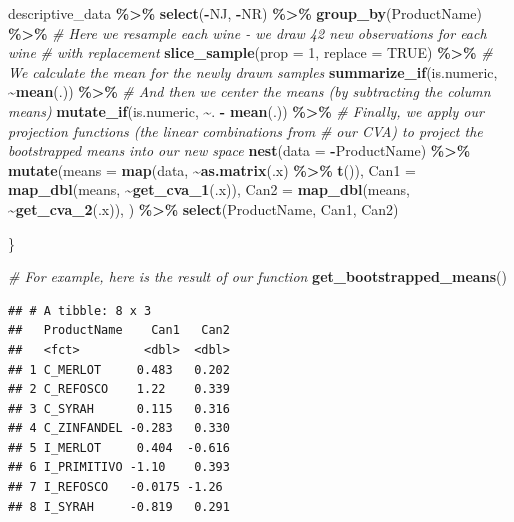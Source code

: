 \documentclass[
]{book}
\newenvironment{Shaded}{\begin{snugshade}}{\end{snugshade}}
\newcommand{\AttributeTok}[1]{\textcolor[rgb]{0.13,0.29,0.53}{#1}}
\newcommand{\CommentTok}[1]{\textcolor[rgb]{0.56,0.35,0.01}{\textit{#1}}}
\newcommand{\ConstantTok}[1]{\textcolor[rgb]{0.56,0.35,0.01}{#1}}
\newcommand{\DecValTok}[1]{\textcolor[rgb]{0.00,0.00,0.81}{#1}}
\newcommand{\FunctionTok}[1]{\textcolor[rgb]{0.13,0.29,0.53}{\textbf{#1}}}
\newcommand{\NormalTok}[1]{#1}
\newcommand{\SpecialCharTok}[1]{\textcolor[rgb]{0.81,0.36,0.00}{\textbf{#1}}}
\begin{document}
\begin{Shaded}
\begin{Highlighting}[]
\NormalTok{  descriptive\_data }\SpecialCharTok{\%\textgreater{}\%}
  \FunctionTok{select}\NormalTok{(}\SpecialCharTok{{-}}\NormalTok{NJ, }\SpecialCharTok{{-}}\NormalTok{NR) }\SpecialCharTok{\%\textgreater{}\%}
  \FunctionTok{group\_by}\NormalTok{(ProductName) }\SpecialCharTok{\%\textgreater{}\%}
    \CommentTok{\# Here we resample each wine {-} we draw 42 new observations for each wine}
    \CommentTok{\# with replacement}
  \FunctionTok{slice\_sample}\NormalTok{(}\AttributeTok{prop =} \DecValTok{1}\NormalTok{, }\AttributeTok{replace =} \ConstantTok{TRUE}\NormalTok{) }\SpecialCharTok{\%\textgreater{}\%}
    \CommentTok{\# We calculate the mean for the newly drawn samples}
  \FunctionTok{summarize\_if}\NormalTok{(is.numeric, }\SpecialCharTok{\textasciitilde{}}\FunctionTok{mean}\NormalTok{(.)) }\SpecialCharTok{\%\textgreater{}\%} 
    \CommentTok{\# And then we center the means (by subtracting the column means)}
  \FunctionTok{mutate\_if}\NormalTok{(is.numeric, }\SpecialCharTok{\textasciitilde{}}\NormalTok{. }\SpecialCharTok{{-}} \FunctionTok{mean}\NormalTok{(.)) }\SpecialCharTok{\%\textgreater{}\%}
    \CommentTok{\# Finally, we apply our projection functions (the linear combinations from}
    \CommentTok{\# our CVA) to project the bootstrapped means into our new space}
  \FunctionTok{nest}\NormalTok{(}\AttributeTok{data =} \SpecialCharTok{{-}}\NormalTok{ProductName) }\SpecialCharTok{\%\textgreater{}\%}
  \FunctionTok{mutate}\NormalTok{(}\AttributeTok{means =} \FunctionTok{map}\NormalTok{(data, }\SpecialCharTok{\textasciitilde{}}\FunctionTok{as.matrix}\NormalTok{(.x) }\SpecialCharTok{\%\textgreater{}\%} \FunctionTok{t}\NormalTok{()),}
         \AttributeTok{Can1 =} \FunctionTok{map\_dbl}\NormalTok{(means, }\SpecialCharTok{\textasciitilde{}}\FunctionTok{get\_cva\_1}\NormalTok{(.x)),}
         \AttributeTok{Can2 =} \FunctionTok{map\_dbl}\NormalTok{(means, }\SpecialCharTok{\textasciitilde{}}\FunctionTok{get\_cva\_2}\NormalTok{(.x)),}
\NormalTok{         ) }\SpecialCharTok{\%\textgreater{}\%}
    \FunctionTok{select}\NormalTok{(ProductName, Can1, Can2)}
  
\NormalTok{\}}

\CommentTok{\# For example, here is the result of our function}
\FunctionTok{get\_bootstrapped\_means}\NormalTok{()}
\end{Highlighting}
\end{Shaded}

\begin{verbatim}
## # A tibble: 8 x 3
##   ProductName    Can1   Can2
##   <fct>         <dbl>  <dbl>
## 1 C_MERLOT     0.483   0.202
## 2 C_REFOSCO    1.22    0.339
## 3 C_SYRAH      0.115   0.316
## 4 C_ZINFANDEL -0.283   0.330
## 5 I_MERLOT     0.404  -0.616
## 6 I_PRIMITIVO -1.10    0.393
## 7 I_REFOSCO   -0.0175 -1.26 
## 8 I_SYRAH     -0.819   0.291
\end{verbatim}
\end{document}
